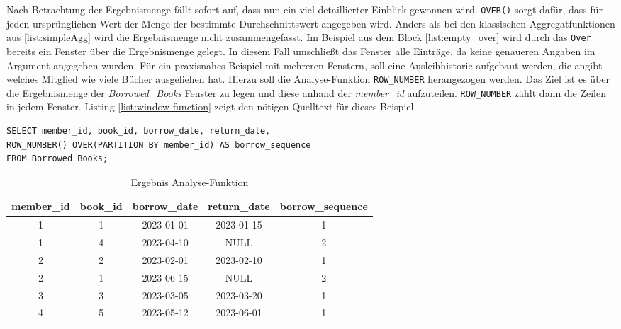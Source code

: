 Nach Betrachtung der Ergebnismenge fällt sofort auf, dass nun ein viel
detaillierter Einblick gewonnen wird. \texttt{OVER()} sorgt dafür, dass für jeden
ursprünglichen Wert der Menge der bestimmte Durchschnittswert angegeben wird.
Anders als bei den klassischen Aggregatfunktionen aus \ref{list:simpleAgg} wird
die Ergebnismenge nicht zusammengefasst. Im Beispiel aus dem Block \ref{list:empty_over}
wird durch das \texttt{Over} bereits ein Fenster über die Ergebnismenge gelegt. In
diesem Fall umschließt das Fenster alle Einträge, da keine genaueren Angaben im
Argument angegeben wurden. Für ein praxisnahes Beispiel mit mehreren Fenstern,
soll eine Ausleihhistorie aufgebaut werden, die angibt welches Mitglied wie viele
Bücher ausgeliehen hat. Hierzu soll die Analyse-Funktion \texttt{ROW\_NUMBER} herangezogen
werden. Das Ziel ist es über die Ergebnismenge der \textit{Borrowed\_Books} Fenster
zu legen und diese anhand der \textit{member\_id} aufzuteilen. \texttt{ROW\_NUMBER}
zählt dann die Zeilen in jedem Fenster. Listing \ref{list:window-function} zeigt
den nötigen Quelltext für dieses Beispiel.

\begin{lstlisting}
SELECT member_id, book_id, borrow_date, return_date,
ROW_NUMBER() OVER(PARTITION BY member_id) AS borrow_sequence
FROM Borrowed_Books;
\end{lstlisting}
\begin{table}[h]
	\centering
	\begin{tabular}{|c|c|c|c|c|}
		\hline
		\textbf{member\_id} & \textbf{book\_id} & \textbf{borrow\_date} & \textbf{return\_date} & \textbf{borrow\_sequence} \\
		\hline
		1                   & 1                 & 2023-01-01            & 2023-01-15            & 1                         \\
		\hline
		1                   & 4                 & 2023-04-10            & NULL                  & 2                         \\
		\hline
		2                   & 2                 & 2023-02-01            & 2023-02-10            & 1                         \\
		\hline
		2                   & 1                 & 2023-06-15            & NULL                  & 2                         \\
		\hline
		3                   & 3                 & 2023-03-05            & 2023-03-20            & 1                         \\
		\hline
		4                   & 5                 & 2023-05-12            & 2023-06-01            & 1                         \\
		\hline
	\end{tabular}
	\caption{Ergebnis Analyse-Funktion}
	\label{tab:member_borrows}
\end{table}

